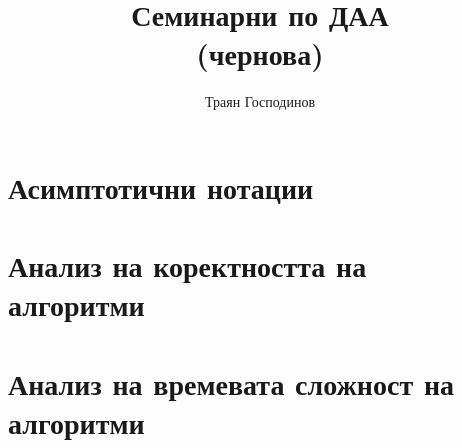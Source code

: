\documentclass[a4paper,12pt,oneside]{book}%
\title{Семинарни по ДАА\\\large (чернова)}
\author{Траян Господинов}
\begin{document}
 
	
	\maketitle
	
	\tableofcontents
	
	\chapter{Асимптотични нотации}
	
	
	\chapter{Анализ на коректността на алгоритми}
	
	
	\chapter{Анализ на времевата сложност на алгоритми}
	

\end{document}
